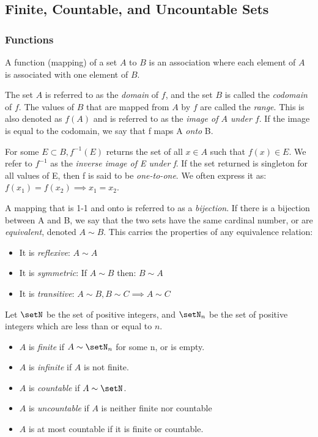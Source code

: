 \documentclass[12pt, letterpaper]{paper}
\begin{document}
\subsection{Finite, Countable, and Uncountable Sets}
\label{sec:org6611534}

\subsubsection{Functions}
\label{sec:org99a080e}
A function (mapping) of a set $A$ to $B$ is an association where each
element of $A$ is associated with one element of $B$.

The set $A$ is referred to as the \emph{domain} of $f$, and the set
$B$ is called the \emph{codomain} of $f$. The values of $B$ that are
mapped from $A$ by $f$ are called the \emph{range}. This is also
denoted as $f(A)$ and is referred to as the \emph{image of $A$ under
  $f$}. If the image is equal to the codomain, we say that f maps A
\emph{onto} B.

For some $E \subset B, f^{-1} (E)$ returns the set of all $x \in A$
such that $f(x) \in E$. We refer to $f^{-1}$ as the \emph{inverse
  image of E under f}. If the set returned is singleton for all values
of E, then f is said to be \emph{one-to-one}. We often express it as:
$f(x_{1}) = f(x_{2}) \implies x_{1} = x_{2}$.

A mapping that is 1-1 and onto is referred to as a
\emph{bijection}. If there is a bijection between A and B, we say that
the two sets have the same cardinal number, or are \emph{equivalent},
denoted $A \sim B$. This carries the properties of any equivalence
relation:
\begin{itemize}
\item It is \emph{reflexive}: $A \sim A$
\item It is \emph{symmetric}: If $A \sim B$ then: $B \sim A$
\item It is \emph{transitive}: $A \sim B, B \sim C \implies A \sim C$
\end{itemize}

\vspace{ .33in }

Let $\setN$ be the set of positive integers, and $\setN_n$ be the set
of positive integers which are less than or equal to $n$.

\begin{itemize}
\item $A$ is \emph{finite} if $A \sim\setN_n$ for some n, or is empty.
\item $A$ is \emph{infinite} if $A$ is not finite.
\item $A$ is \emph{countable} if $A \sim \setN$.
\item $A$ is \emph{uncountable} if $A$ is neither finite nor countable
\item $A$ is at most countable if it is finite or countable.
\end{itemize}
\end{document}
